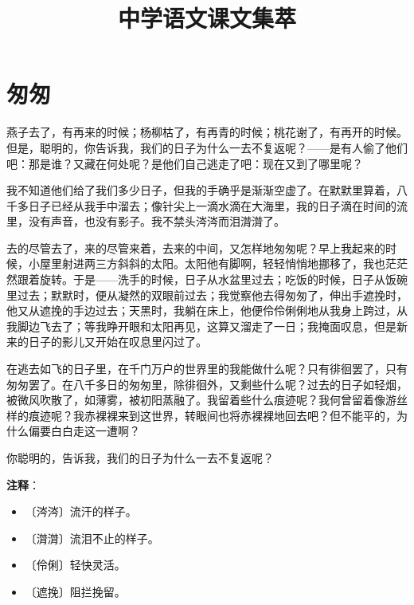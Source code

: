 \documentclass[12pt,UTF-8,openany]{ctexbook}
\title{\zihao{0} \bfseries 中学语文课文集萃}
\author{}
\date{}
\begin{document}
\maketitle
\tableofcontents
\newpage

\chapter{匆匆}

\begin{normalsize}
    
    燕子去了，有再来的时候；杨柳枯了，有再青的时候；桃花谢了，有再开的时候。但是，聪明的，你告诉我，我们的日子为什么一去不复返呢？——是有人偷了他们吧：那是谁？又藏在何处呢？是他们自己逃走了吧：现在又到了哪里呢？
    
    我不知道他们给了我们多少日子，但我的手确乎是渐渐空虚了。在默默里算着，八千多日子已经从我手中溜去；像针尖上一滴水滴在大海里，我的日子滴在时间的流里，没有声音，也没有影子。我不禁头涔涔而泪潸潸了。
    
    去的尽管去了，来的尽管来着，去来的中间，又怎样地匆匆呢？早上我起来的时候，小屋里射进两三方斜斜的太阳。太阳他有脚啊，轻轻悄悄地挪移了，我也茫茫然跟着旋转。于是——洗手的时候，日子从水盆里过去；吃饭的时候，日子从饭碗里过去；默默时，便从凝然的双眼前过去；我觉察他去得匆匆了，伸出手遮挽时，他又从遮挽的手边过去；天黑时，我躺在床上，他便伶伶俐俐地从我身上跨过，从我脚边飞去了；等我睁开眼和太阳再见，这算又溜走了一日；我掩面叹息，但是新来的日子的影儿又开始在叹息里闪过了。
    
    在逃去如飞的日子里，在千门万户的世界里的我能做什么呢？只有徘徊罢了，只有匆匆罢了。在八千多日的匆匆里，除徘徊外，又剩些什么呢？过去的日子如轻烟，被微风吹散了，如薄雾，被初阳蒸融了。我留着些什么痕迹呢？我何曾留着像游丝样的痕迹呢？我赤裸裸来到这世界，转眼间也将赤裸裸地回去吧？但不能平的，为什么偏要白白走这一遭啊？
    
    你聪明的，告诉我，我们的日子为什么一去不复返呢？
    
\end{normalsize}


\newpage

\textbf{注释}：

\vspace{-1em}

\begin{itemize}
    \setlength\itemsep{-0.2em}
    \item 〔涔涔〕流汗的样子。
    \item 〔潸潸〕流泪不止的样子。
    \item 〔伶俐〕轻快灵活。
    \item 〔遮挽〕阻拦挽留。
\end{itemize}
\end{document}
